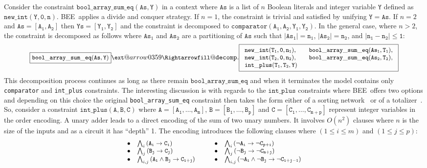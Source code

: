 \documentclass[runningheads,a4paper]{llncs}
\makeatletter
\newcommand{\xRightarrow}[2][]{\ext@arrow 0359\Rightarrowfill@{#1}{#2}}
\newcommand{\bee}{\textsf{BEE}}
\makeatother
\begin{document}
Consider the constraint $\mathtt{bool\_array\_sum\_eq(As,Y)}$ in a
context where $\mathtt{As}$ is a list of $n$ Boolean literals and
integer variable $\mathtt{Y}$ defined as
$\mathtt{new\_int(Y,0,n)}$. \bee\ applies a divide and conquer
strategy. If $n=1$, the constraint is trivial and satisfied by
unifying $\mathtt{Y=As}$. If $n=2$ and $\mathtt{As=[A_1,A_2]}$ then
$\mathtt{Ys=[Y_1,Y_2]}$ and the constraint is decomposed to
$\mathtt{comparator(A_1,A_2,Y_1,Y_2)}$. In the general case, where
$n>2$, the constraint is decomposed as follows where $\mathtt{As_1}$
and $\mathtt{As_2}$ are a partitioning of $\mathtt{As}$ such that
$\mathtt{|As_1|=n_1}$, $\mathtt{|As_2|=n_2}$, and
$\mathtt{|n_1-n_2|\leq 1}$:
\[\small
\fbox{$\mathtt{bool\_array\_sum\_eq(As,Y)}$}
\xRightarrow[]{\mathtt{decomp.}}
\fbox{$
  \begin{array}{ll}
    \mathtt{new\_int(T_1,0,n_1)},\quad & \mathtt{bool\_array\_sum\_eq(As_1,T_1)},\\
    \mathtt{new\_int(T_2,0,n_2)},\quad & \mathtt{bool\_array\_sum\_eq(As_2,T_2)},\\
    \mathtt{int\_plus(T_1,T_2,Y)}  
  \end{array}$}
\] 
This decomposition process continues as long as there remain
$\mathtt{bool\_array\_sum\_eq}$ and when it terminates the model contains
only \texttt{comparator} and \texttt{int\_plus} constraints.
The interesting discussion is with regards to the $\mathtt{int\_plus}$
constraints where \bee\ offers two options and depending on this
choice the original \texttt{bool\_array\_sum\_eq} constraint then
takes the form either of a sorting network~\cite{Batcher68} or of a
totalizer~\cite{BailleuxB03}.
So, consider a  constraint $\mathtt{int\_plus(A,B,C)}$ where
$\mathtt{A=[A_1,\ldots,A_m]}$, $\mathtt{B=[B_1,\ldots,B_p]}$ and
$\mathtt{C=[C_1,\ldots,C_{m+p}]}$ represent integer variables in the
order encoding.
A unary adder leads to a direct encoding of the sum of two unary
numbers. It involves $O(n^2)$  clauses where $n$ is the size of
the inputs and as a circuit it has ``depth'' 1. The encoding introduces
the following clauses where $(1\leq i\leq m)$ and $(1\leq j\leq p)$:
\[\small
\begin{array}{llll}
  \bullet & \bigwedge_i \mathtt{(A_i \rightarrow C_i)} &
  \bullet & \bigwedge_i \mathtt{(\neg A_i \rightarrow \neg C_{p+i})}\\
  \bullet & \bigwedge_j \mathtt{(B_j \rightarrow C_j)} &
  \bullet & \bigwedge_j \mathtt{(\neg B_j \rightarrow \neg C_{m+j})}\\
  \bullet & \bigwedge_{i,j} \mathtt{(A_i \wedge B_j \rightarrow C_{i+j})} \qquad& 
  \bullet & \bigwedge_{i,j} \mathtt{(\neg A_i \wedge \neg B_j \rightarrow \neg C_{i+j-1})}\\
\end{array}
\]
\end{document}
